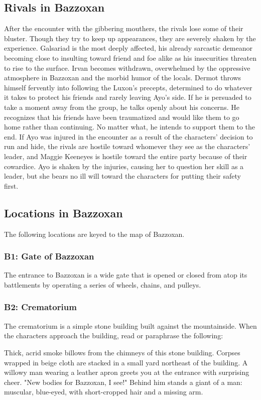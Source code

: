 \documentclass[10pt,a4,twoside,twocolumn,openany,nodeprecatedcode]{dndbook}
\begin{document}
\subsection{Rivals in Bazzoxan}
After the encounter with the gibbering mouthers, the rivals lose some of their bluster. Though they try to keep up appearances, they are severely shaken by the experience. Galsariad is the most deeply affected, his already sarcastic demeanor becoming close to insulting toward friend and foe alike as his insecurities threaten to rise to the surface. Irvan becomes withdrawn, overwhelmed by the oppressive atmosphere in Bazzoxan and the morbid humor of the locals. Dermot throws himself fervently into following the Luxon's precepts, determined to do whatever it takes to protect his friends and rarely leaving Ayo's side. If he is persuaded to take a moment away from the group, he talks openly about his concerns. He recognizes that his friends have been traumatized and would like them to go home rather than continuing. No matter what, he intends to support them to the end.
If Ayo was injured in the encounter as a result of the characters' decision to run and hide, the rivals are hostile toward whomever they see as the characters' leader, and Maggie Keeneyes is hostile toward the entire party because of their cowardice. Ayo is shaken by the injuries, causing her to question her skill as a leader, but she bears no ill will toward the characters for putting their safety first.
\subsection{Locations in Bazzoxan}
The following locations are keyed to the map of Bazzoxan.
\subsubsection{B1: Gate of Bazzoxan}
The entrance to Bazzoxan is a wide gate that is opened or closed from atop its battlements by operating a series of wheels, chains, and pulleys.
\subsubsection{B2: Crematorium}
The crematorium is a simple stone building built against the mountainside.
When the characters approach the building, read or paraphrase the following:
\begin{DndReadAloud}{}
Thick, acrid smoke billows from the chimneys of this stone building. Corpses wrapped in beige cloth are stacked in a small yard northeast of the building.
A willowy man wearing a leather apron greets you at the entrance with surprising cheer. "New bodies for Bazzoxan, I see!" Behind him stands a giant of a man: muscular, blue-eyed, with short-cropped hair and a missing arm.
\end{DndReadAloud}
\end{document}

